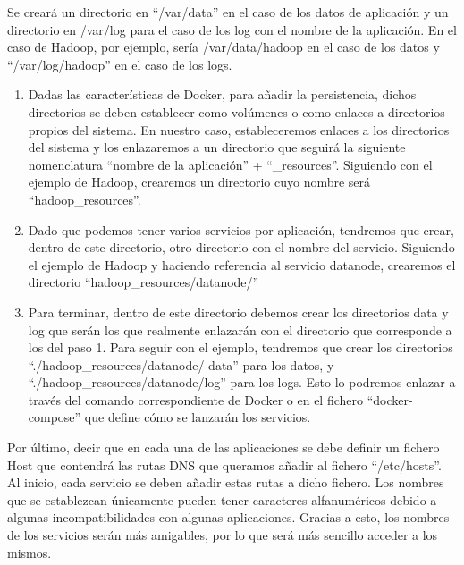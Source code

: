 Se creará un directorio en “/var/data” en el caso de los datos de aplicación y un directorio en /var/log para el caso de los log con el nombre de la aplicación. En el caso de Hadoop, por ejemplo, sería     /var/data/hadoop en el caso de los datos y “/var/log/hadoop” en el caso de los logs.
\begin{enumerate}

\item Dadas las características de Docker, para añadir la persistencia, dichos directorios se deben establecer como volúmenes o como enlaces a directorios propios del sistema. En nuestro caso, estableceremos enlaces a los directorios del sistema y los enlazaremos a un directorio que seguirá la siguiente nomenclatura “nombre de la aplicación” + “\_resources”. Siguiendo con el ejemplo de Hadoop, crearemos un directorio cuyo nombre será     “hadoop\_resources”.         

\item Dado que podemos tener varios servicios por aplicación, tendremos que crear, dentro de este directorio, otro directorio con el nombre del servicio. Siguiendo el ejemplo de Hadoop y haciendo referencia al servicio datanode, crearemos el directorio “hadoop\_resources/datanode/”

\item Para terminar, dentro de este directorio debemos crear los directorios data y log que serán los que realmente enlazarán con el directorio que corresponde a los del paso 1. Para seguir con el ejemplo, tendremos que crear los directorios “./hadoop\_resources/datanode/ data” para los datos, y “./hadoop\_resources/datanode/log” para los logs. Esto lo podremos enlazar a través del comando correspondiente de Docker o en el fichero “docker-compose” que define cómo se lanzarán los servicios.

\end{enumerate}

Por último, decir que en cada una de las aplicaciones se debe definir un fichero Host que contendrá las rutas DNS que queramos añadir al fichero “/etc/hosts”. Al inicio, cada servicio se deben añadir estas rutas a dicho fichero. Los nombres que se establezcan únicamente pueden tener caracteres alfanuméricos debido a algunas incompatibilidades con algunas aplicaciones. Gracias a esto, los nombres de los servicios serán más amigables, por lo que será más sencillo acceder a los mismos.\par

